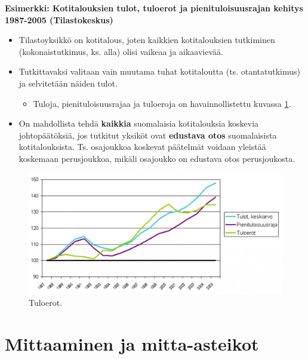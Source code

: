 \documentclass[
]{book}
\providecommand{\tightlist}{%
  \setlength{\itemsep}{0pt}\setlength{\parskip}{0pt}}
\begin{document}
\begin{eblock}{}

\textbf{Esimerkki: Kotitalouksien tulot, tuloerot ja pienituloisuusrajan kehitys 1987-2005 (Tilastokeskus)}

\begin{itemize}
\tightlist
\item
  Tilastoyksikkö on kotitalous, joten kaikkien kotitalouksien tutkiminen (kokonaistutkimus, ks. alla) olisi vaikeaa ja aikaavievää.
\item
  Tutkittavaksi valitaan vain muutama tuhat kotitaloutta (ts. otantatutkimus) ja selvitetään näiden tulot.

  \begin{itemize}
  \tightlist
  \item
    Tuloja, pienituloisuusrajaa ja tuloeroja on havainnollistettu kuvassa \ref{fig:tuloerot}.
  \end{itemize}
\item
  On mahdollista tehdä \textbf{kaikkia} suomalaisia kotitalouksia koskevia johtopäätöksiä, jos tutkitut yksiköt ovat \textbf{edustava otos} suomalaisista kotitalouksista. Ts. osajoukkoa koskevat päätelmät voidaan yleistää koskemaan perusjoukkoa, mikäli osajoukko on edustava otos perusjoukosta.
\end{itemize}

\end{eblock}

\FloatBarrier

\begin{figure}

{\centering \includegraphics[width=1\linewidth]{images/tuloerot} 

}

\caption{Tuloerot.}\label{fig:tuloerot}
\end{figure}

\hypertarget{alaluku53}{%
\section{Mittaaminen ja mitta-asteikot}\label{alaluku53}}
\end{document}
